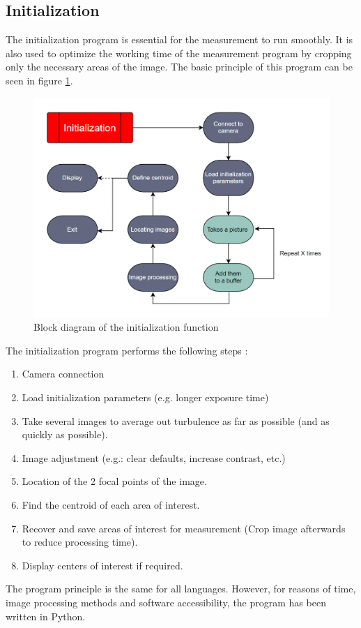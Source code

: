 \subsection{Initialization}
The initialization program is essential for the measurement to run smoothly. It is also used to optimize the working
time of the measurement program by cropping only the necessary areas of the image. The basic principle of this program
can be seen in figure \ref{fig:Soft_Init}.
\begin{figure}[H]
    \centering
    \includegraphics[scale=0.85]{assets/figures/Software/Initialization.png}
    \caption{Block diagram of the initialization function}
    \label{fig:Soft_Init}
\end{figure}
The initialization program performs the following steps :
\begin{enumerate}
    \item Camera connection
    \item Load initialization parameters (e.g. longer exposure time)
    \item Take several images to average out turbulence as far as possible (and as quickly as possible).
    \item Image adjustment (e.g.: clear defaults, increase contrast, etc.)
    \item Location of the 2 focal points of the image.
    \item Find the centroid of each area of interest.
    \item Recover and save areas of interest for measurement (Crop image afterwards to reduce processing time).
    \item Display centers of interest if required.
\end{enumerate}
The program principle is the same for all languages. However, for reasons of time, image processing methods and
software accessibility, the program has been written in Python.
\newpage
